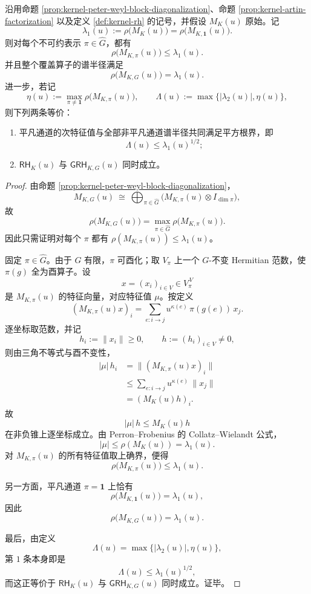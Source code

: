 \begin{theorem}\label{thm:xi-time-part64-cover-perron-root-trivial-channel}
沿用命题 \ref{prop:kernel-peter-weyl-block-diagonalization}、命题 \ref{prop:kernel-artin-factorization} 以及定义 \ref{def:kernel-rh} 的记号，并假设 \(M_K(u)\) 原始。记
\[
\lambda_1(u):=\rho\!\bigl(M_K(u)\bigr)=\rho\!\bigl(M_{K,\mathbf 1}(u)\bigr).
\]
则对每个不可约表示 \(\pi\in\widehat G\)，都有
\[
\boxed{\;
\rho\!\bigl(M_{K,\pi}(u)\bigr)\le \lambda_1(u).\;}
\]
并且整个覆盖算子的谱半径满足
\[
\boxed{\;
\rho\!\bigl(M_{K,G}(u)\bigr)=\lambda_1(u).\;}
\]
进一步，若记
\[
\eta(u):=\max_{\pi\neq \mathbf 1}\rho\!\bigl(M_{K,\pi}(u)\bigr),
\qquad
\Lambda(u):=\max\{|\lambda_2(u)|,\eta(u)\},
\]
则下列两条等价：
\begin{enumerate}
  \item 平凡通道的次特征值与全部非平凡通道谱半径共同满足平方根界，即
  \[
  \Lambda(u)\le \lambda_1(u)^{1/2};
  \]
  \item \(\textsf{RH}_K(u)\) 与 \(\textsf{GRH}_{K,G}(u)\) 同时成立。
\end{enumerate}
\end{theorem}
\begin{proof}
由命题 \ref{prop:kernel-peter-weyl-block-diagonalization}，
\[
M_{K,G}(u)
\ \cong\
\bigoplus_{\pi\in\widehat G}
\bigl(M_{K,\pi}(u)\otimes I_{\dim\pi}\bigr),
\]
故
\[
\rho\!\bigl(M_{K,G}(u)\bigr)
=
\max_{\pi\in\widehat G}\rho\!\bigl(M_{K,\pi}(u)\bigr).
\]
因此只需证明对每个 \(\pi\) 都有
\(
\rho(M_{K,\pi}(u))\le \lambda_1(u)
\)。

固定 \(\pi\in\widehat G\)。由于 \(G\) 有限，\(\pi\) 可酉化；取 \(V_\pi\) 上一个 \(G\)-不变 Hermitian 范数，使 \(\pi(g)\) 全为酉算子。设
\[
x=(x_i)_{i\in V}\in V_\pi^{\,V}
\]
是 \(M_{K,\pi}(u)\) 的特征向量，对应特征值 \(\mu\)。按定义
\[
(M_{K,\pi}(u)x)_i
=
\sum_{e:i\to j}u^{\kappa(e)}\,\pi(g(e))\,x_j.
\]
逐坐标取范数，并记
\[
h_i:=\|x_i\|\ge 0,
\qquad
h:=(h_i)_{i\in V}\neq 0,
\]
则由三角不等式与酉不变性，
\[
\begin{aligned}
|\mu|\,h_i
&=
\bigl\|(M_{K,\pi}(u)x)_i\bigr\|\\
&\le
\sum_{e:i\to j}u^{\kappa(e)}\,\|x_j\|\\
&=
(M_K(u)h)_i.
\end{aligned}
\]
故
\[
|\mu|\,h\le M_K(u)h
\]
在非负锥上逐坐标成立。由 Perron--Frobenius 的 Collatz--Wielandt 公式，
\[
|\mu|\le \rho(M_K(u))=\lambda_1(u).
\]
对 \(M_{K,\pi}(u)\) 的所有特征值取上确界，便得
\[
\rho\!\bigl(M_{K,\pi}(u)\bigr)\le \lambda_1(u).
\]

另一方面，平凡通道 \(\pi=\mathbf 1\) 上恰有
\[
\rho\!\bigl(M_{K,\mathbf 1}(u)\bigr)=\lambda_1(u),
\]
因此
\[
\rho\!\bigl(M_{K,G}(u)\bigr)=\lambda_1(u).
\]

最后，由定义
\[
\Lambda(u)=\max\{|\lambda_2(u)|,\eta(u)\},
\]
第 \(1\) 条本身即是
\[
\Lambda(u)\le \lambda_1(u)^{1/2},
\]
而这正等价于 \(\textsf{RH}_K(u)\) 与 \(\textsf{GRH}_{K,G}(u)\) 同时成立。证毕。
\end{proof}

\endinput

